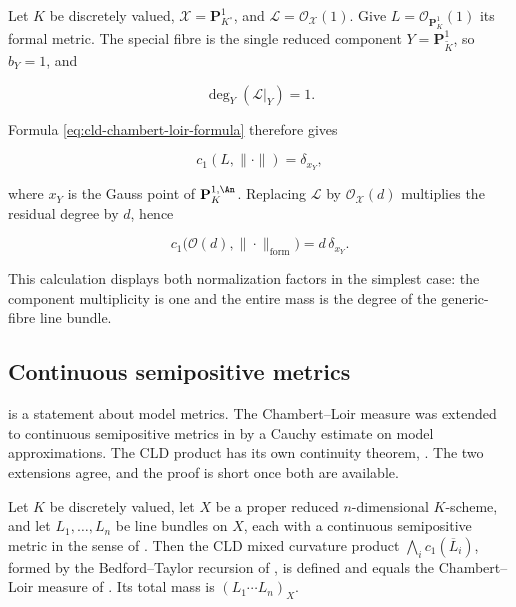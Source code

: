 \begin{example}
\label{ex:ch17-standard-p1-formal}
Let $K$ be discretely valued,
$\mathcal X=\mathbf P^1_{K^\circ}$, and
$\mathcal L=\mathcal O_{\mathcal X}(1)$.  Give
$L=\mathcal O_{\mathbf P^1_K}(1)$ its formal metric.  The special fibre is
the single reduced component
$Y=\mathbf P^1_{\widetilde K}$, so $b_Y=1$, and

\[
            \deg_Y(\mathcal L|_Y)=1.
\]

Formula \eqref{eq:cld-chambert-loir-formula} therefore gives

\[
                 c_1(L,\|\cdot\|)=\delta_{x_Y},
\]

where $x_Y$ is the Gauss point of $\mathbf P^{1,\An}_K$.  Replacing
$\mathcal L$ by $\mathcal O_{\mathcal X}(d)$ multiplies the residual
degree by $d$, hence

\[
          c_1\bigl(\mathcal O(d),\|\cdot\|_{\mathrm{form}}\bigr)
             =d\,\delta_{x_Y}.
\]

This calculation displays both normalization factors in the simplest case:
the component multiplicity is one and the entire mass is the degree of the
generic-fibre line bundle.
\end{example}

\subsection{Continuous semipositive metrics}
\label{sec:ch17-cl-continuous}

 is a statement about model metrics.  The
Chambert--Loir measure was extended to continuous semipositive metrics in
 by a Cauchy estimate on model
approximations.  The CLD product has its own continuity theorem,
.  The two extensions agree, and the proof is
short once both are available.

\begin{theorem}
\label{thm:ch17-cl-continuous}
Let $K$ be discretely valued, let $X$ be a proper reduced
$n$-dimensional $K$-scheme, and let $L_1,\dots,L_n$ be line bundles on
$X$, each with a continuous semipositive metric in the sense of
.  Then the CLD mixed curvature product
$\bigwedge_ic_1(\overline L_i)$, formed by the Bedford--Taylor recursion
of , is defined and equals the
Chambert--Loir measure of .  Its total
mass is $(L_1\cdots L_n)_X$.
\end{theorem}

